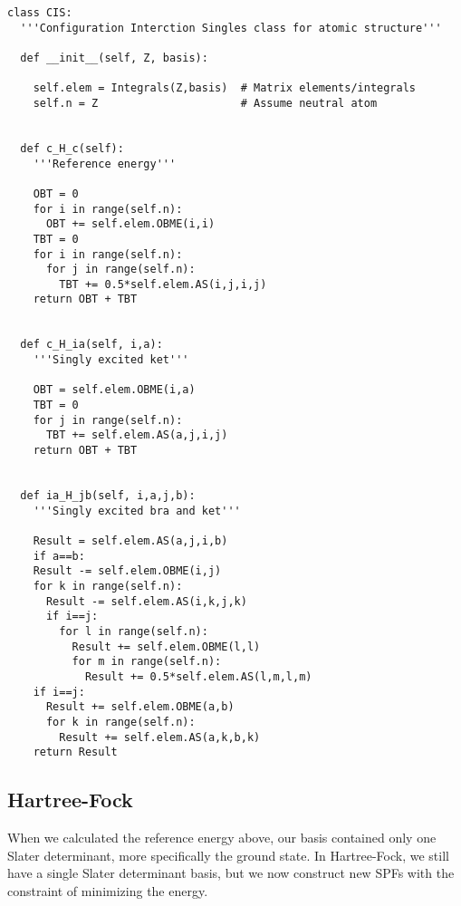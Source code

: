 \lstset{basicstyle=\scriptsize}
\begin{lstlisting}
class CIS:
  '''Configuration Interction Singles class for atomic structure'''

  def __init__(self, Z, basis):

    self.elem = Integrals(Z,basis)  # Matrix elements/integrals
    self.n = Z                      # Assume neutral atom


  def c_H_c(self):
    '''Reference energy'''

    OBT = 0
    for i in range(self.n):
      OBT += self.elem.OBME(i,i)
    TBT = 0
    for i in range(self.n):
      for j in range(self.n):
        TBT += 0.5*self.elem.AS(i,j,i,j)
    return OBT + TBT


  def c_H_ia(self, i,a):
    '''Singly excited ket'''

    OBT = self.elem.OBME(i,a)
    TBT = 0
    for j in range(self.n):
      TBT += self.elem.AS(a,j,i,j)
    return OBT + TBT


  def ia_H_jb(self, i,a,j,b):
    '''Singly excited bra and ket'''

    Result = self.elem.AS(a,j,i,b)
    if a==b:
    Result -= self.elem.OBME(i,j)
    for k in range(self.n):
      Result -= self.elem.AS(i,k,j,k)
      if i==j:
        for l in range(self.n):
          Result += self.elem.OBME(l,l)
          for m in range(self.n):
            Result += 0.5*self.elem.AS(l,m,l,m)
    if i==j:
      Result += self.elem.OBME(a,b)
      for k in range(self.n):
        Result += self.elem.AS(a,k,b,k)
    return Result
\end{lstlisting}

\subsection{Hartree-Fock}
When we calculated the reference energy above, our basis contained only one Slater determinant, more specifically the ground state. In Hartree-Fock, we still have a single Slater determinant basis, but we now construct new SPFs with the constraint of minimizing the energy. 

